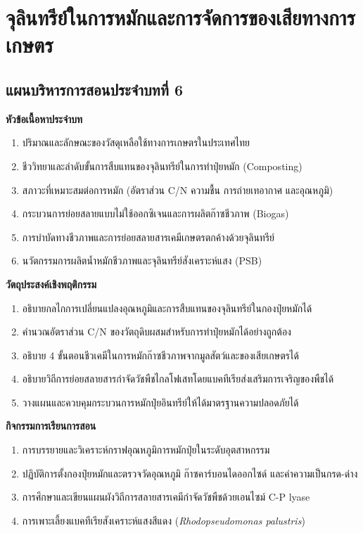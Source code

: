\chapter{จุลินทรีย์ในการหมักและการจัดการของเสียทางการเกษตร}
\label{chap:ch06}

\section*{แผนบริหารการสอนประจำบทที่ 6}

\noindent\textbf{หัวข้อเนื้อหาประจำบท}
\begin{enumerate}
    \item ปริมาณและลักษณะของวัสดุเหลือใช้ทางการเกษตรในประเทศไทย
    \item ชีววิทยาและลำดับขั้นการสืบแทนของจุลินทรีย์ในการทำปุ๋ยหมัก (Composting)
    \item สภาวะที่เหมาะสมต่อการหมัก (อัตราส่วน C/N ความชื้น การถ่ายเทอากาศ และอุณหภูมิ)
    \item กระบวนการย่อยสลายแบบไม่ใช้ออกซิเจนและการผลิตก๊าซชีวภาพ (Biogas)
    \item การบำบัดทางชีวภาพและการย่อยสลายสารเคมีเกษตรตกค้างด้วยจุลินทรีย์
    \item นวัตกรรมการผลิตน้ำหมักชีวภาพและจุลินทรีย์สังเคราะห์แสง (PSB)
\end{enumerate}

\noindent\textbf{วัตถุประสงค์เชิงพฤติกรรม}
\begin{enumerate}
    \item อธิบายกลไกการเปลี่ยนแปลงอุณหภูมิและการสืบแทนของจุลินทรีย์ในกองปุ๋ยหมักได้
    \item คำนวณอัตราส่วน C/N ของวัตถุดิบผสมสำหรับการทำปุ๋ยหมักได้อย่างถูกต้อง
    \item อธิบาย 4 ขั้นตอนชีวเคมีในการหมักก๊าซชีวภาพจากมูลสัตว์และของเสียเกษตรได้
    \item อธิบายวิถีการย่อยสลายสารกำจัดวัชพืชไกลโฟเสทโดยแบคทีเรียส่งเสริมการเจริญของพืชได้
    \item วางแผนและควบคุมกระบวนการหมักปุ๋ยอินทรีย์ให้ได้มาตรฐานความปลอดภัยได้
\end{enumerate}

\noindent\textbf{กิจกรรมการเรียนการสอน}
\begin{enumerate}
    \item การบรรยายและวิเคราะห์กราฟอุณหภูมิการหมักปุ๋ยในระดับอุตสาหกรรม
    \item ปฏิบัติการตั้งกองปุ๋ยหมักและตรวจวัดอุณหภูมิ ก๊าซคาร์บอนไดออกไซด์ และค่าความเป็นกรด-ด่าง
    \item การศึกษาและเขียนแผนผังวิถีการสลายสารเคมีกำจัดวัชพืชด้วยเอนไซม์ C-P lyase
    \item การเพาะเลี้ยงแบคทีเรียสังเคราะห์แสงสีแดง (\textit{Rhodopseudomonas palustris})
\end{enumerate}

